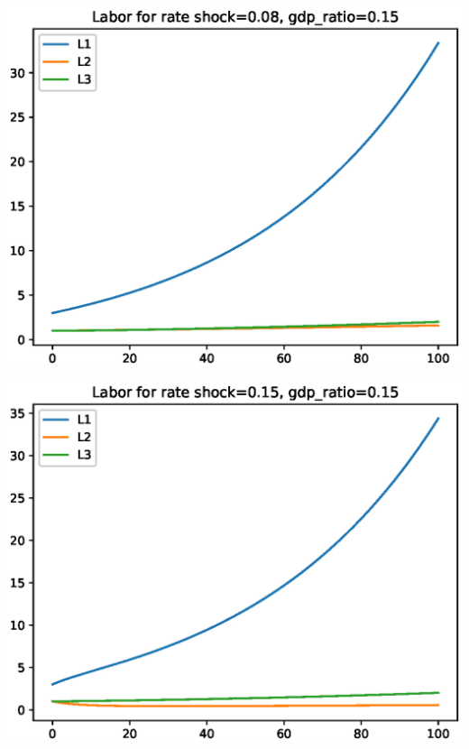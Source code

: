\documentclass[12pt]{article}
\theoremstyle{definition}
\begin{document}
\begin{minipage}{\linewidth}
\begin{framed}
\begin{minipage}[t]{.48\textwidth}
\includegraphics[width=1\textwidth]{images/econ_0_run_4_labor}
\end{minipage}\hfill
\begin{minipage}[t]{.48\textwidth}
\centering
\includegraphics[width=1\textwidth]{images/econ_0_run_5_labor}
\end{minipage}\hfill
\begin{minipage}[t]{.48\textwidth}
\centering

\end{minipage}
\end{framed}
\end{minipage}
\end{document}
